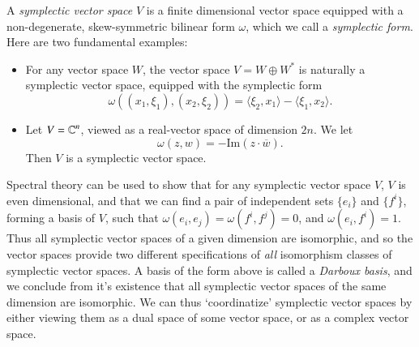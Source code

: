 A \emph{symplectic vector space} $V$ is a finite dimensional vector space equipped with a non-degenerate, skew-symmetric bilinear form $\omega$, which we call a \emph{symplectic form}. Here are two fundamental examples:
%
\begin{itemize}
    \item For any vector space $W$, the vector space $V = W \oplus W^*$ is naturally a symplectic vector space, equipped with the symplectic form
    \[ \omega((x_1,\xi_1),(x_2,\xi_2)) = \langle \xi_2, x_1 \rangle - \langle \xi_1, x_2 \rangle. \]

    \item Let $V = \operatorname{\mathbb{C}}^n$, viewed as a real-vector space of dimension $2n$. We let
    \[ \omega(z,w) = - \text{Im} \left( z \cdot \overline{w} \right). \]
    Then $V$ is a symplectic vector space.
\end{itemize}
%
Spectral theory can be used to show that for any symplectic vector space $V$, $V$ is even dimensional, and that we can find a pair of independent sets $\{ e_i \}$ and $\{ f^i \}$, forming a basis of $V$, such that $\omega(e_i,e_j) = \omega(f^i,f^j) = 0$, and $\omega(e_i,f^i) = 1$. Thus all symplectic vector spaces of a given dimension are isomorphic, and so the vector spaces provide two different specifications of \emph{all} isomorphism classes of symplectic vector spaces. A basis of the form above is called a \emph{Darboux basis}, and we conclude from it's existence that all symplectic vector spaces of the same dimension are isomorphic. We can thus `coordinatize' symplectic vector spaces by either viewing them as a dual space of some vector space, or as a complex vector space.

%
%
%

